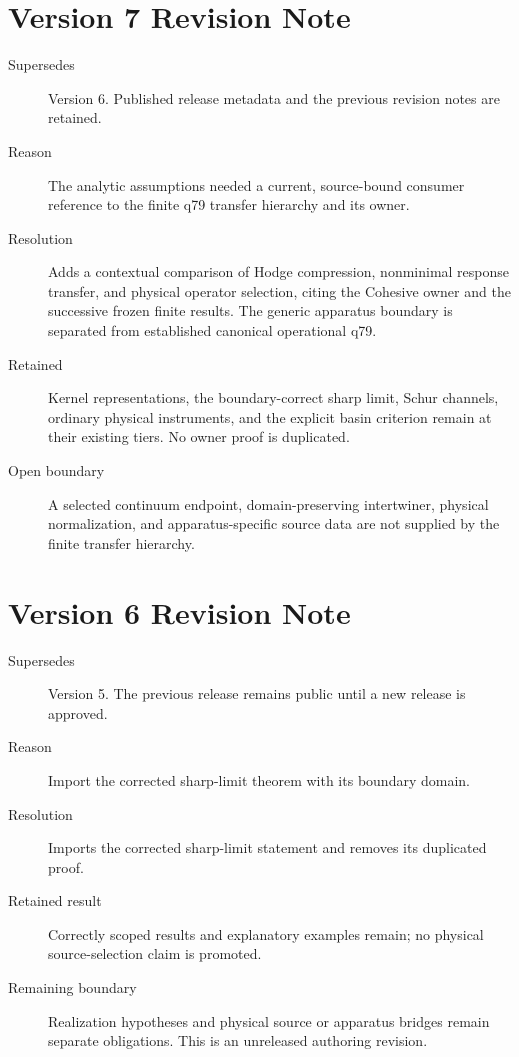 \documentclass[11pt]{article}
\begin{document}
\section*{Version 7 Revision Note}
\begin{description}
\item[Supersedes] Version 6. Published release metadata and the previous
revision notes are retained.
\item[Reason] The analytic assumptions needed a current, source-bound
consumer reference to the finite q79 transfer hierarchy and its owner.
\item[Resolution] Adds a contextual comparison of Hodge compression,
nonminimal response transfer, and physical operator selection, citing the
Cohesive owner and the successive frozen finite results. The generic
apparatus boundary is separated from established canonical operational q79.
\item[Retained] Kernel representations, the boundary-correct sharp limit,
Schur channels, ordinary physical instruments, and the explicit basin
criterion remain at their existing tiers. No owner proof is duplicated.
\item[Open boundary] A selected continuum endpoint, domain-preserving
intertwiner, physical normalization, and apparatus-specific source data
are not supplied by the finite transfer hierarchy.
\end{description}

\section*{Version 6 Revision Note}
\begin{description}
\item[Supersedes] Version 5. The previous release remains public until a new release is approved.
\item[Reason] Import the corrected sharp-limit theorem with its boundary domain.
\item[Resolution] Imports the corrected sharp-limit statement and removes its duplicated proof.
\item[Retained result] Correctly scoped results and explanatory examples remain; no physical source-selection claim is promoted.
\item[Remaining boundary] Realization hypotheses and physical source or apparatus bridges remain separate obligations. This is an unreleased authoring revision.
\end{description}
\end{document}
